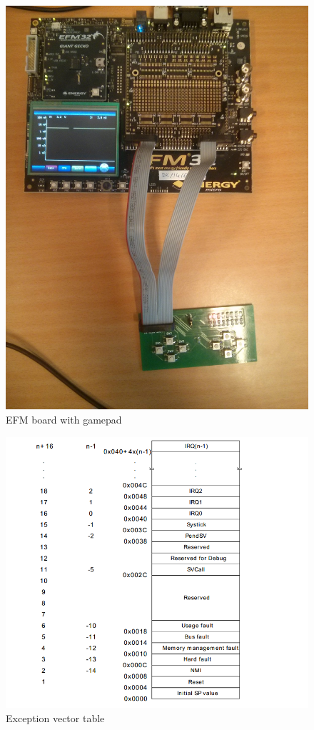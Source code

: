 \begin{figure}[ht]
 \centering
 \includegraphics[width=\textwidth]{images/efm_board.jpg}
 \caption{EFM board with gamepad}
 \label{fig:EFMBoard}
\end{figure}

\begin{figure}[ht]
 \centering
 \includegraphics[width=\textwidth]{images/vector_table.png}
 \caption{Exception vector table}
 \label{fig:VectorTable}
\end{figure}
